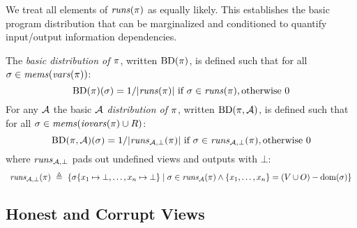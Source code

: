 We treat all elements of $\mathit{runs}(\pi)$ as equally likely.  This
establishes the basic program distribution that can be marginalized
and conditioned to quantify input/output information dependencies.
\begin{definition}
  \label{def-progtt}
  \label{def-progd}
  \label{definition-progd}
  The \emph{basic distribution of $\pi$}, written $\mathrm{BD}(\pi)$, is
  defined such that for all $\sigma \in \mathit{mems}(\mathit{vars}(\pi))$:
  $$
  \mathrm{BD}(\pi)(\sigma) =  1 / |\mathit{runs}(\pi)| \ \text{if}\ \sigma \in \mathit{runs}(\pi), \text{otherwise}\ 0
  $$
  For any $\mathcal{A}$ the basic \emph{$\mathcal{A}$ distribution of $\pi$}, written
  $\mathrm{BD}(\pi,\mathcal{A})$, is
  defined such that for all $\sigma \in \mathit{mems}(\mathit{iovars}(\pi) \cup R)$:
  $$
  \mathrm{BD}(\pi,\mathcal{A})(\sigma) =  1 / |\mathit{runs}_{\mathcal{A},\bot}(\pi)| \ \text{if}\ \sigma \in \mathit{runs}_{\mathcal{A},\bot}(\pi), \text{otherwise}\ 0
  $$
  where $\mathit{runs}_{\mathcal{A},\bot}$ pads out undefined views and outputs with $\bot$:
  $$
  \begin{array}{c}
    \botruns(\prog)\ \defeq\ %
    \{ \store\{ x_1 \mapsto \bot, \ldots, x_n \mapsto \bot \} \mid 
    \store \in \aruns(\prog) \wedge \{ x_1,\ldots,x_n\} = (V \cup O) - \dom(\store) \}
  \end{array}
  $$
\end{definition}


\subsection{Honest and Corrupt Views}

